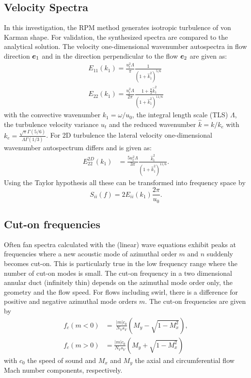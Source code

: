 \subsection{Velocity Spectra}\label{app:VelSpectra}
In this investigation, the RPM method generates isotropic turbulence of von Karman shape. For validation, the synthesized spectra are compared to the analytical solution. The velocity one-dimensional wavenumber autospectra in flow direction $\boldsymbol{e}_1$ and in the direction perpendicular to the flow $\boldsymbol{e}_2$ are given as:
\begin{align}
E_{11}(k_1) = \frac{u_t^2\Lambda}{\pi} \frac{1}{(1+\hat k_1^2)^{5/6}}  \label{eq:E11_Karman}\\
E_{22}(k_1) = \frac{u_t^2\Lambda}{2 \pi} \frac{1+\frac{8}{3} \hat k_1^2}{(1+\hat k_1^2)^{11/6}} \label{eq:E22_Karman_3D}
\end{align}
with the convective wavenumber $k_1 = \omega/u_0$, the integral length scale (TLS) $\Lambda$, the turbulence velocity variance $u_t$ and the reduced wavenumber $\hat k = k /k_e$ with $k_e = \frac{\sqrt{\pi}\Gamma(5/6)}{\Lambda\Gamma(1/3)}$. For 2D turbulence the lateral velocity one-dimensional wavenumber autospectrum differs and is given as:
\begin{align}\label{eq:E22_Karman_2D}
E_{22}^{2D}(k_1) &= \frac{5 u_t^2\Lambda}{3\pi}  \frac{\hat k_1^2}{\left(1+\hat k_1^2\right)^{11/6}}.
\end{align}
Using the Taylor hypothesis all these can be transformed into frequency space by
\begin{equation}\label{eq:Sii}
S_{ii}(f)=2 E_{ii}(k_1)\frac{2\pi}{u_0}.
\end{equation}


\subsection{Cut-on frequencies}\label{app:cuton}
Often fan spectra calculated with the (linear) wave equations exhibit peaks at frequencies where a new acoustic mode of azimuthal order $m$ and $n$  suddenly becomes cut-on. This is particularly true in the low frequency range where the number of cut-on modes is small. The cut-on frequency in a two dimensional annular duct (infinitely thin) depends on the azimuthal mode order only, the geometry and the flow speed. For flows including swirl, there is a difference for positive and negative azimuthal mode orders $m$. The cut-on frequencies are given by
\begin{align}
f_c(m<0) &= \
\frac{|m| c_0}{N_V s_V} \left(M_y - \sqrt{1-M_x^2}\right), \\
f_c(m>0) &= 
\frac{|m| c_0}{N_V s_V} \left(M_y + \sqrt{1-M_x^2}\right)
\end{align}
with $c_0$ the speed of sound and $M_x$ and $M_y$  the axial and circumferential flow Mach number components, respectively.

